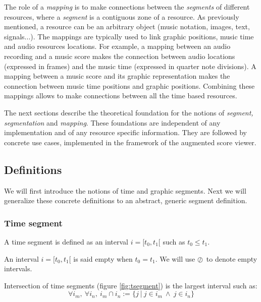 \documentclass{article}
\newcommand{\emptyseg}		{\ensuremath{\oslash}}
\begin{document}
The role of a \emph{mapping} is to make connections between the \emph{segments} of different resources, where a \emph{segment} is a contiguous zone of a resource. As previously mentioned, a resource can be an arbitrary object (music notation, images, text, signals...). The mappings are typically used to link graphic positions, music time and audio resources locations. For example, a mapping between an audio recording and a music score makes the connection between audio locations (expressed in frames) and the music time (expressed in quarter note divisions). A mapping between a music score and its graphic representation makes the connection between music time positions and graphic positions. Combining these mappings allows to make connections between all the time based resources.

The next sections describe the theoretical foundation for the notions of \emph{segment, segmentation} and \emph{mapping}. These foundations are independent of any implementation and of any resource specific information. They are followed by concrete use cases, implemented in the framework of the augmented score viewer.


\subsection{Definitions}
We will first introduce the notions of time and graphic segments. Next we will generalize these concrete definitions to an abstract, generic segment definition.

\subsubsection{Time segment}

A time segment is defined as an interval
 $i=[t_0,t_1[$ such as $t_0 \leqslant t_1$.

An interval $i=[t_0,t_1[$ is said empty when $t_0 = t_1$. We will use \emptyseg\ to denote empty intervals.

Intersection of time  segments (figure \ref{fig:tsegment}) is the largest interval such as:
\[ \forall i_{m},\ \forall  i_{n}, 
\ i_{m} \cap i_{n}  := \{ j \ |\ j \in i_m \ \land\ j \in i_n \}
\]
\end{document}
